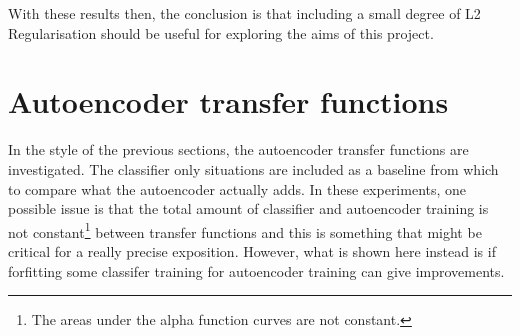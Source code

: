     With these results then, the conclusion is that including a small degree of L2
    Regularisation should be useful for exploring the aims of this project.

    \newpage

  \section{Autoencoder transfer functions}
  In the style of the previous sections, the autoencoder transfer functions are investigated.
  The classifier only situations are included as a baseline from which to compare
  what the autoencoder actually adds. In these experiments, one possible issue is that
  the total amount of classifier and autoencoder training is not constant\footnote{The areas under the alpha function curves are not constant.} between transfer functions
  and this is something that might be critical for a really precise exposition. However, what is shown here
  instead is if forfitting some classifer training for autoencoder training can give improvements.



